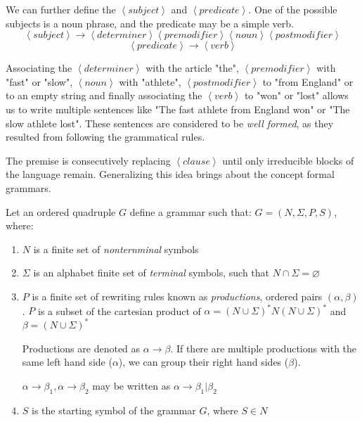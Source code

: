 We can further define the $\left< subject \right>$ and $\left< predicate \right>$. One of the possible subjects is a noun phrase, and the predicate may be a simple verb.
$$\left< subject \right>   \rightarrow   \left< determiner \right>   \left< premodifier \right>    \left< noun \right>    \left< postmodifier \right>$$
$$\left< predicate \right> \rightarrow \left< verb \right>$$

Associating the $\left< determiner \right>$ with the article "the", $\left< premodifier \right>$ with "fast" or "slow", $\left< noun \right>$ with "athlete", $\left< postmodifier \right>$ to "from England" or to an empty string and finally associating the $\left< verb \right>$ to "won" or "lost" allows us to write multiple sentences like "The fast athlete from England won" or "The slow athlete lost". These sentences are considered to be \emph{well formed}, as they resulted from following the grammatical rules.

The premise is consecutively replacing $\left< clause \right>$ until only irreducible blocks of the language remain. Generalizing this idea brings about the concept formal grammars.

\begin{definition}[Grammar]
\label{def:grammar}
\cite{Salomaa1987Formal}
Let an ordered quadruple $G$ define a grammar such that: $G=\left(N, \Sigma, P, S \right)$, where:
\begin{enumerate}
\item $N$ is a finite set of \emph{nonternminal} symbols
\item $\Sigma$ is an alphabet finite set of \emph{terminal} symbols, such that $N \cap \Sigma = \varnothing$
\item $P$ is a finite set of rewriting rules known as \emph{productions}, ordered pairs $\left( \alpha, \beta \right)$.
$P$ is a subset of the cartesian product of $\alpha = \left(N \cup \Sigma\right)^* N \left(N \cup \Sigma\right)^*$ and $\beta = \left(N \cup \Sigma\right)^*$


Productions are denoted as $\alpha \rightarrow \beta$.
If there are multiple productions with the same left hand side ($\alpha$), we can group their right hand sides ($\beta$).


$\alpha \rightarrow \beta_1, \alpha \rightarrow \beta_2$ may be written as $\alpha \rightarrow \beta_1 | \beta_2$

\item $S$ is the starting symbol of the grammar $G$, where $S \in N$
\end{enumerate}
\end{definition}

